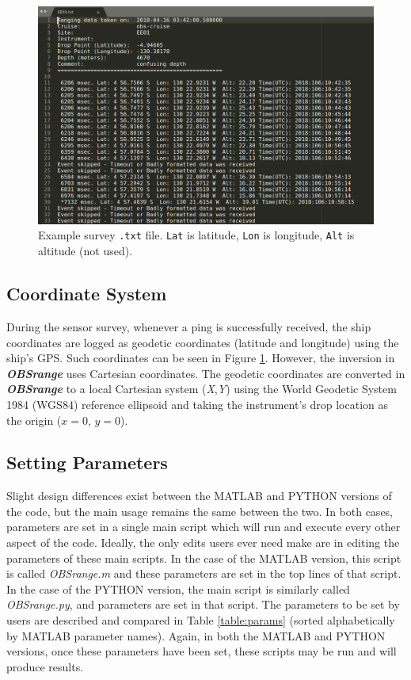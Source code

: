 \documentclass[titlepage, 12pt]{article}
\begin{document}
  \begin{figure}[!htb]
   \includegraphics[width=\linewidth]{survey_fle_ex.png}
   \caption{Example survey \texttt{.txt} file. \texttt{Lat} is latitude, \texttt{Lon} is longitude, \texttt{Alt} is altitude (not used). }
   \label{fig:surveyfle}
  \end{figure} 
  
  \subsection{Coordinate System}
During the sensor survey, whenever a ping is successfully received, the ship coordinates are logged as geodetic coordinates (latitude and longitude) using the ship's GPS. Such coordinates can be seen in Figure \ref{fig:surveyfle}. However, the inversion in \textit{\textbf{OBSrange}} uses Cartesian coordinates. The geodetic coordinates are converted in \textit{\textbf{OBSrange}} to a local Cartesian system (\textit{X},\textit{Y}) using the World Geodetic System 1984 (WGS84) reference ellipsoid and taking the instrument's drop location as the origin ($x=0$, $y=0$).  
  \subsection{Setting Parameters}
  \label{section:params}
  Slight design differences exist between the MATLAB and PYTHON versions of the code, but the main usage remains the same between the two. In both cases, parameters are set in a single main script which will run and execute every other aspect of the code. Ideally, the only edits users ever need make are in editing the parameters of these main scripts. In the case of the MATLAB version, this script is called \textit{OBSrange.m} and these parameters are set in the top lines of that script. In the case of the PYTHON version, the main script is similarly called \textit{OBSrange.py}, and parameters are set in that script. The parameters to be set by users are described and compared in Table \ref{table:params} (sorted alphabetically by MATLAB parameter names).  Again, in both the MATLAB and PYTHON versions, once these parameters have been set, these scripts may be run and will produce results. 
\end{document}
